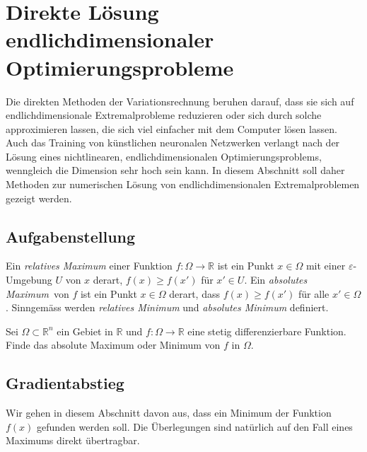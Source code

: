 %
%
%
\section{Direkte Lösung endlichdimensionaler Optimierungsprobleme
\label{buch:direkt:section:gradient}}
Die direkten Methoden der Variationsrechnung beruhen darauf, dass
sie sich auf endlichdimensionale Extremalprobleme reduzieren oder
sich durch solche approximieren lassen, die sich viel einfacher
mit dem Computer lösen lassen.
Auch das Training von künstlichen neuronalen Netzwerken verlangt nach
der Lösung eines nichtlinearen, endlichdimensionalen Optimierungsproblems,
wenngleich die Dimension sehr hoch sein kann.
In diesem Abschnitt soll daher Methoden zur numerischen Lösung von
endlichdimensionalen Extremalproblemen gezeigt werden.

%
%
\subsection{Aufgabenstellung
\label{buch:direkt:gradient:subsection:aufgabenstellung}}

\begin{definition}
Ein {\em relatives Maximum} einer Funktion $f\colon\Omega\to\mathbb{R}$
ist ein Punkt $x\in\Omega$ mit einer $\varepsilon$-Umgebung
$U$ von $x$ derart, $f(x)\ge f(x')$ für $x'\in U$.
Ein {\em absolutes Maximum} von $f$ ist ein Punkt $x\in\Omega$ derart,
dass $f(x)\ge f(x')$ für alle $x'\in\Omega$.
Sinngemäss werden {\em relatives Minimum} und {\em absolutes Minimum}
definiert.
%
%
%
%
%
%
%
%
\end{definition}

\begin{aufgabe}
\label{buch:direkt:gradient:aufgabe:extremal}
Sei $\Omega\subset\mathbb{R}^n$ ein Gebiet in $\mathbb{R}$ und
$f\colon\Omega\to\mathbb{R}$ eine stetig differenzierbare
Funktion.
Finde das absolute Maximum oder Minimum von $f$ in $\Omega$.
\end{aufgabe}

%
%
\subsection{Gradientabstieg
\label{buch:direkt:gradient:subdsection:gradientabstieg}}
Wir gehen in diesem Abschnitt davon aus, dass ein Minimum der Funktion
$f(x)$ gefunden werden soll.
Die Überlegungen sind natürlich auf den Fall eines Maximums direkt
übertragbar.

